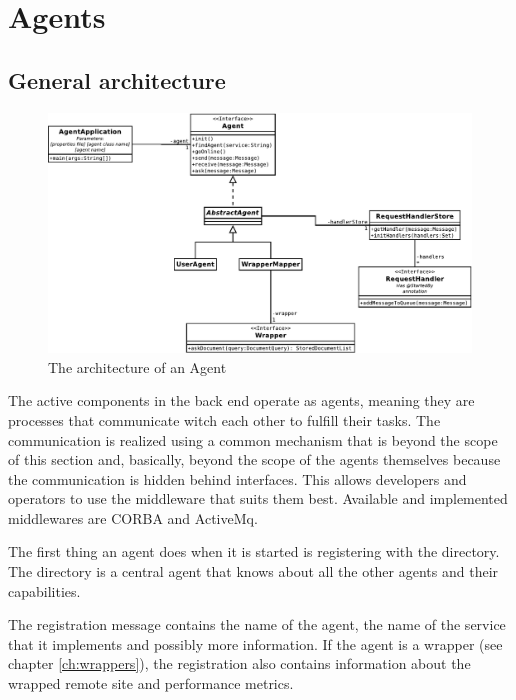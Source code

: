 \documentclass[12pt]{book}
\begin{document}
%
%
%
%
%
\chapter{Agents \label{ch:agents}}

\section{General architecture \label{sec:agents:architecture}}

\begin{figure}[t]
\begin{center}
  \includegraphics[width=.75\linewidth]{Agent}
  \caption{The architecture of an Agent}
  \label{fig:agentarchitecture}
\end{center}
\end{figure}



The active components in the back end  operate as agents, meaning they are processes that communicate witch each other to fulfill their tasks. The communication is realized using a common mechanism that is beyond the scope of this section and, basically, beyond the scope of the agents themselves because the communication is hidden behind interfaces. This allows developers and operators to use the middleware that suits them best. Available and implemented middlewares are CORBA and ActiveMq.

The first thing an agent does when it is started is registering with the directory. The directory is a central agent that knows about all the other agents and their capabilities. 

The registration message contains the name of the agent, the name of the service that it implements and possibly more information. If the agent is a wrapper (see chapter \ref{ch:wrappers}), the registration also contains information about the wrapped remote site and performance metrics.
\end{document}
